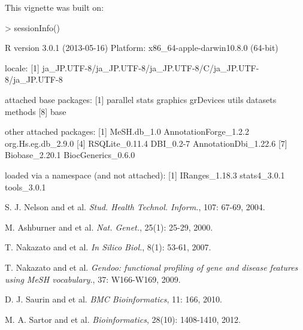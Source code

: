 \documentclass[11pt]{article}
\begin{document}
This vignette was built on:
\begin{Schunk}
\begin{Sinput}
> sessionInfo()
\end{Sinput}
\begin{Soutput}
R version 3.0.1 (2013-05-16)
Platform: x86_64-apple-darwin10.8.0 (64-bit)

locale:
[1] ja_JP.UTF-8/ja_JP.UTF-8/ja_JP.UTF-8/C/ja_JP.UTF-8/ja_JP.UTF-8

attached base packages:
[1] parallel  stats     graphics  grDevices utils     datasets  methods  
[8] base     

other attached packages:
[1] MeSH.db_1.0           AnnotationForge_1.2.2 org.Hs.eg.db_2.9.0   
[4] RSQLite_0.11.4        DBI_0.2-7             AnnotationDbi_1.22.6 
[7] Biobase_2.20.1        BiocGenerics_0.6.0   

loaded via a namespace (and not attached):
[1] IRanges_1.18.3 stats4_3.0.1   tools_3.0.1   
\end{Soutput}
\end{Schunk}

\newpage

\vspace{2cm}

\begin{thebibliography}{9}

S. J. Nelson and et al.
\newblock \emph{Stud. Health Technol. Inform.}, 107: 67-69, 2004.

M. Ashburner and et al.
\newblock \emph{Nat. Genet.}, 25(1): 25-29, 2000.

T. Nakazato and et al.
\newblock \emph {In Silico Biol.}, 8(1): 53-61, 2007.

T. Nakazato and et al.
\newblock \emph {Gendoo: functional profiling of gene and disease features using MeSH vocabulary.}, 37: W166-W169, 2009.

D. J. Saurin and et al.
\newblock \emph {BMC Bioinformatics}, 11: 166, 2010.

M. A. Sartor and et al.
\newblock \emph {Bioinformatics}, 28(10): 1408-1410, 2012.

\end{thebibliography}
\end{document}
